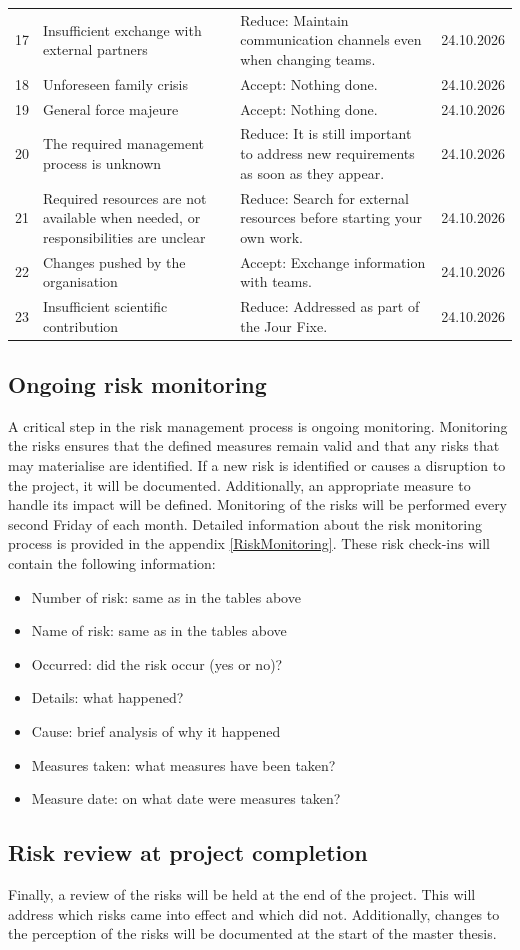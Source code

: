 \begin{longtable}{@{}C{1cm}L{3.5cm}L{9cm}C{2.5cm}@{}}
17 & Insufficient exchange with external partners & Reduce: Maintain communication channels even when changing teams. & 24.10.2026 \\
18 & Unforeseen family crisis & Accept: Nothing done. & 24.10.2026 \\
19 & General force majeure & Accept: Nothing done. & 24.10.2026 \\
20 & The required management process is unknown & Reduce: It is still important to address new requirements as soon as they appear. & 24.10.2026 \\
21 & Required resources are not available when needed, or responsibilities are unclear & Reduce: Search for external resources before starting your own work. & 24.10.2026 \\
22 & Changes pushed by the organisation & Accept: Exchange information with teams. & 24.10.2026 \\
23 & Insufficient scientific contribution & Reduce: Addressed as part of the Jour Fixe. & 24.10.2026 \\

\end{longtable}

\subsection*{Ongoing risk monitoring}
A critical step in the risk management process is ongoing monitoring. Monitoring the risks ensures that the defined measures remain valid and that any risks that may materialise are identified. If a new risk is identified or causes a disruption to the project, it will be documented. Additionally, an appropriate measure to handle its impact will be defined. Monitoring of the risks will be performed every second Friday of each month. Detailed information about the risk monitoring process is provided in the appendix \ref{RiskMonitoring}.
These risk check-ins will contain the following information:

\begin{itemize}
\item Number of risk: same as in the tables above
\item Name of risk: same as in the tables above
\item Occurred: did the risk occur (yes or no)?
\item Details: what happened?
\item Cause: brief analysis of why it happened
\item Measures taken: what measures have been taken?
\item Measure date: on what date were measures taken?
\end{itemize}

\subsection*{Risk review at project completion}

Finally, a review of the risks will be held at the end of the project. This will address which risks came into effect and which did not. Additionally, changes to the perception of the risks will be documented at the start of the master thesis. 
